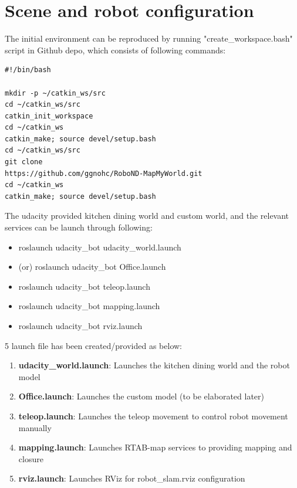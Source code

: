 \documentclass[10pt,journal,compsoc]{IEEEtran}
\begin{document}
\section{Scene and robot configuration}

The initial environment can be reproduced by running "create\_workspace.bash" script in Github depo, which consists of following commands:

\begin{verbatim}
#!/bin/bash

mkdir -p ~/catkin_ws/src
cd ~/catkin_ws/src
catkin_init_workspace
cd ~/catkin_ws
catkin_make; source devel/setup.bash
cd ~/catkin_ws/src
git clone 
https://github.com/ggnohc/RoboND-MapMyWorld.git
cd ~/catkin_ws
catkin_make; source devel/setup.bash
\end{verbatim}

The udacity provided kitchen dining world and custom world, and the relevant services can be launch through following:
\begin{itemize}
\item roslaunch udacity\_bot udacity\_world.launch
\item (or) roslaunch udacity\_bot Office.launch
\item roslaunch udacity\_bot teleop.launch
\item roslaunch udacity\_bot mapping.launch
\item roslaunch udacity\_bot rviz.launch
\end {itemize}

5 launch file has been created/provided as below:
\begin{enumerate}
    \item \textbf{udacity\_world.launch}: Launches the kitchen dining world and the robot model
    \item \textbf{Office.launch}: Launches the custom model (to be elaborated later)
    \item \textbf{teleop.launch}: Launches the teleop movement to control robot movement manually
    \item \textbf{mapping.launch}: Launches RTAB-map services to providing mapping and closure
    \item \textbf{rviz.launch}: Launches RViz for robot\_slam.rviz configuration
\end{enumerate}
\end{document}
